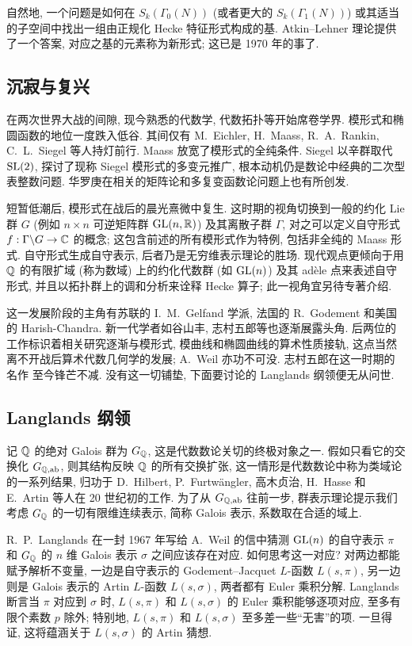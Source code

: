 自然地, 一个问题是如何在 $S_k(\Gamma_0(N))$ (或者更大的 $S_k(\Gamma_1(N))$) 或其适当的子空间中找出一组由正规化 Hecke 特征形式构成的基. Atkin--Lehner 理论提供了一个答案, 对应之基的元素称为新形式; 这已是 1970 年的事了.

\subsection*{沉寂与复兴}
在两次世界大战的间隙, 现今熟悉的代数学, 代数拓扑等开始席卷学界. 模形式和椭圆函数的地位一度跌入低谷. 其间仅有 M.\ Eichler, H.\ Maass, R.\ A.\ Rankin, C.\ L.\ Siegel 等人持灯前行. Maass 放宽了模形式的全纯条件. Siegel 以辛群取代 $\operatorname{SL}(2)$, 探讨了现称 Siegel 模形式的多变元推广, 根本动机仍是数论中经典的二次型表整数问题. 华罗庚在相关的矩阵论和多复变函数论问题上也有所创发.

短暂低潮后, 模形式在战后的晨光熹微中复生. 这时期的视角切换到一般的约化 Lie 群 $G$ (例如 $n \times n$ 可逆矩阵群 $\operatorname{GL}(n, \mathbb{R})$) 及其离散子群 $\Gamma$, 对之可以定义自守形式 $f: \Gamma \backslash G \to \mathbb{C}$ 的概念; 这包含前述的所有模形式作为特例, 包括非全纯的 Maass 形式. 自守形式生成自守表示, 后者乃是无穷维表示理论的胜场. 现代观点更倾向于用 $\mathbb{Q}$ 的有限扩域 (称为数域) 上的约化代数群 (如 $\operatorname{GL}(n)$) 及其 adèle 点来表述自守形式, 并且以拓扑群上的调和分析来诠释 Hecke 算子; 此一视角宜另待专著介绍.

这一发展阶段的主角有苏联的 I.\ M.\ Gelfand 学派, 法国的 R.\ Godement 和美国的 Harish-Chandra. 新一代学者如谷山丰, 志村五郎等也逐渐展露头角. 后两位的工作标识着相关研究逐渐与模形式, 模曲线和椭圆曲线的算术性质接轨, 这点当然离不开战后算术代数几何学的发展; A.\ Weil 亦功不可没. 志村五郎在这一时期的名作 \cite{Shi71} 至今锋芒不减. 没有这一切铺垫, 下面要讨论的 Langlands 纲领便无从问世.

\subsection*{Langlands 纲领}
记 $\mathbb{Q}$ 的绝对 Galois 群为 $G_{\mathbb{Q}}$, 这是代数数论关切的终极对象之一. 假如只看它的交换化 $G_{\mathbb{Q}, \mathrm{ab}}$, 则其结构反映 $\mathbb{Q}$ 的所有交换扩张, 这一情形是代数数论中称为类域论的一系列结果, 归功于 D.\ Hilbert, P.\ Furtwängler, 高木贞治, H.\ Hasse 和 E.\ Artin 等人在 20 世纪初的工作. 为了从 $G_{\mathbb{Q}, \mathrm{ab}}$ 往前一步, 群表示理论提示我们考虑 $G_{\mathbb{Q}}$ 的一切有限维连续表示, 简称 Galois 表示, 系数取在合适的域上.

R.\ P.\ Langlands 在一封 1967 年写给 A.\ Weil 的信中猜测 $\operatorname{GL}(n)$ 的自守表示 $\pi$ 和 $G_{\mathbb{Q}}$ 的 $n$ 维 Galois 表示 $\sigma$ 之间应该存在对应. 如何思考这一对应? 对两边都能赋予解析不变量, 一边是自守表示的 Godement--Jacquet $L$-函数 $L(s, \pi)$, 另一边则是 Galois 表示的 Artin $L$-函数 $L(s, \sigma)$, 两者都有 Euler 乘积分解. Langlands 断言当 $\pi$ 对应到 $\sigma$ 时, $L(s, \pi)$ 和 $L(s, \sigma)$ 的 Euler 乘积能够逐项对应, 至多有限个素数 $p$ 除外; 特别地, $L(s, \pi)$ 和 $L(s, \sigma)$ 至多差一些``无害''的项. 一旦得证, 这将蕴涵关于 $L(s, \sigma)$ 的 Artin 猜想. 

